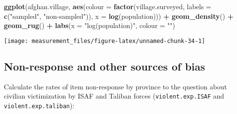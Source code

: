 \documentclass[]{book}
\newenvironment{Shaded}{\begin{snugshade}}{\end{snugshade}}
\newcommand{\KeywordTok}[1]{\textcolor[rgb]{0.13,0.29,0.53}{\textbf{#1}}}
\newcommand{\DataTypeTok}[1]{\textcolor[rgb]{0.13,0.29,0.53}{#1}}
\newcommand{\StringTok}[1]{\textcolor[rgb]{0.31,0.60,0.02}{#1}}
\newcommand{\CommentTok}[1]{\textcolor[rgb]{0.56,0.35,0.01}{\textit{#1}}}
\newcommand{\OperatorTok}[1]{\textcolor[rgb]{0.81,0.36,0.00}{\textbf{#1}}}
\newcommand{\NormalTok}[1]{#1}
\theoremstyle{definition}
\theoremstyle{definition}
\theoremstyle{definition}
\theoremstyle{remark}
\begin{document}
\begin{Shaded}
\begin{Highlighting}[]
\KeywordTok{ggplot}\NormalTok{(afghan.village, }\KeywordTok{aes}\NormalTok{(}\DataTypeTok{colour =} \KeywordTok{factor}\NormalTok{(village.surveyed,}
                                      \DataTypeTok{labels =} \KeywordTok{c}\NormalTok{(}\StringTok{"sampled"}\NormalTok{, }\StringTok{"non-sampled"}\NormalTok{)),}
                           \DataTypeTok{x =} \KeywordTok{log}\NormalTok{(population))) }\OperatorTok{+}
\StringTok{  }\KeywordTok{geom_density}\NormalTok{() }\OperatorTok{+}
\StringTok{  }\KeywordTok{geom_rug}\NormalTok{() }\OperatorTok{+}
\StringTok{  }\KeywordTok{labs}\NormalTok{(}\DataTypeTok{x =} \StringTok{"log(population)"}\NormalTok{, }\DataTypeTok{colour =} \StringTok{""}\NormalTok{)}
\end{Highlighting}
\end{Shaded}

\begin{center}\texttt{[image: measurement\_files/figure-latex/unnamed-chunk-34-1]} \end{center}

\subsection{Non-response and other sources of
bias}\label{non-response-and-other-sources-of-bias}

Calculate the rates of item non-response by province to the question
about civilian victimization by ISAF and Taliban forces
(\texttt{violent.exp.ISAF} and \texttt{violent.exp.taliban}):

\begin{Shaded}
\end{Shaded}
\end{document}
